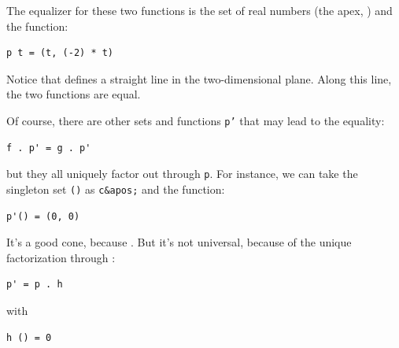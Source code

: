 The equalizer for these two functions is the set of real numbers (the
apex, ) and the function:

\begin{verbatim}
p t = (t, (-2) * t)
\end{verbatim}

Notice that  defines a straight line in the
two-dimensional plane. Along this line, the two functions are equal.

Of course, there are other sets  and functions
\texttt{p'} that may lead to the equality:

\begin{verbatim}
f . p' = g . p'
\end{verbatim}

but they all uniquely factor out through \texttt{p}. For instance, we
can take the singleton set \texttt{()} as \texttt{c\&apos;} and the
function:

\begin{verbatim}
p'() = (0, 0)
\end{verbatim}

It's a good cone, because . But it's
not universal, because of the unique factorization through :

\begin{verbatim}
p' = p . h
\end{verbatim}

with

\begin{verbatim}
h () = 0
\end{verbatim}

\begin{figure}[H]
    \centering
\end{figure}

